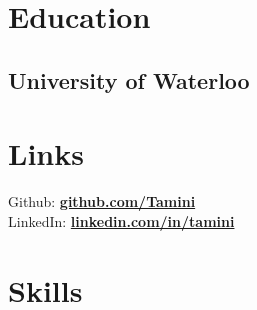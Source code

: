 \documentclass[letterpaper]{deedy-resume-modified} %
\begin{document}



\begin{minipage}[t]{0.33\textwidth} %


\section{Education} 

\subsection{University of Waterloo}


\sectionspace %


\section{Links} 

Github: \href{https://github.com/Tamini}{\bf github.com/Tamini} \\
LinkedIn: \href{https://www.linkedin.com/in/tamini}{\bf linkedin.com/in/tamini} \\

\sectionspace %


\section{Skills}


\end{minipage}
\end{document}

